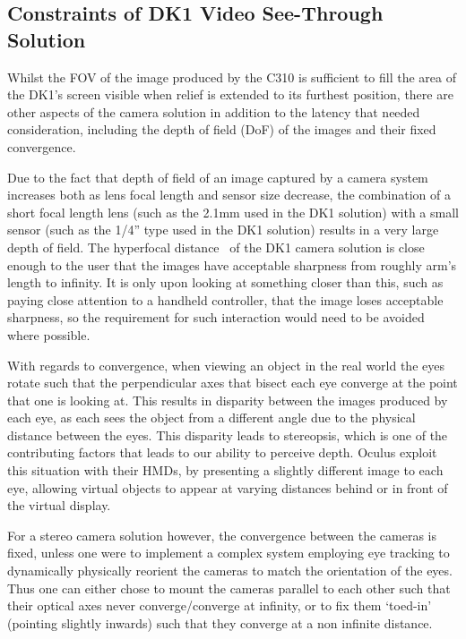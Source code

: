
\subsection{Constraints of DK1 Video See-Through Solution}

\label{constraints_of_dk1_see_through_solution}

Whilst the FOV of the image produced by the C310 is sufficient to fill the area of the DK1's screen visible when relief is extended to its furthest position, there are other aspects of the camera solution in addition to the latency that needed consideration, including the depth of field (DoF) of the images and their fixed convergence.

Due to the fact that depth of field of an image captured by a camera system increases both as lens focal length and sensor size decrease, the combination of a short focal length lens (such as the 2.1mm used in the DK1 solution) with a small sensor (such as the 1/4'' type used in the DK1 solution) results in a very large depth of field. The hyperfocal distance~\cite{Kingslake1992} of the DK1 camera solution is close enough to the user that the images have acceptable sharpness from roughly arm's length to infinity. It is only upon looking at something closer than this, such as paying close attention to a handheld controller, that the image loses acceptable sharpness, so the requirement for such interaction would need to be avoided where possible.

With regards to convergence, when viewing an object in the real world the eyes rotate such that the perpendicular axes that bisect each eye converge at the point that one is looking at. This results in disparity between the images produced by each eye, as each sees the object from a different angle due to the physical distance between the eyes. This disparity leads to stereopsis, which is one of the contributing factors that leads to our ability to perceive depth. Oculus exploit this situation with their HMDs, by presenting a slightly different image to each eye, allowing virtual objects to appear at varying distances behind or in front of the virtual display.

For a stereo camera solution however, the convergence between the cameras is fixed, unless one were to implement a complex system employing eye tracking to dynamically physically reorient the cameras to match the orientation of the eyes. Thus one can either chose to mount the cameras parallel to each other such that their optical axes never converge/converge at infinity, or to fix them `toed-in' (pointing slightly inwards) such that they converge at a non infinite distance.

